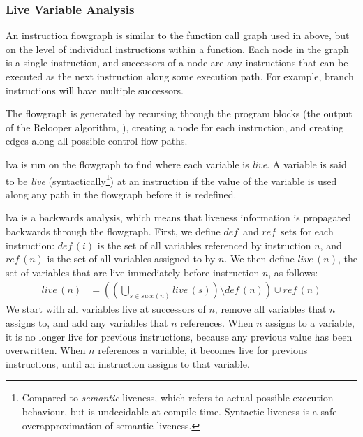 \documentclass[00-main.tex]{subfiles}
\begin{document}
\subsubsection{Live Variable Analysis}

\newcommand{\lvadef}{\ensuremath{\mathit{def}}}
\newcommand{\lvaref}{\ensuremath{\mathit{ref}}}

An instruction flowgraph is similar to the function call graph used in  above, but on the level of individual instructions within a function.
Each node in the graph is a single instruction, and successors of a node are any instructions that can be executed as the next instruction along some execution path.
For example, branch instructions will have multiple successors.

The flowgraph is generated by recursing through the program blocks (the output of the Relooper algorithm, ), creating a node for each instruction, and creating edges along all possible control flow paths.

\Gls{lva} is run on the flowgraph to find where each variable is \emph{live}.
A variable is said to be \emph{live} (syntactically\footnote{Compared to \emph{semantic} liveness, which refers to actual possible execution behaviour, but is undecidable at compile time. Syntactic liveness is a safe overapproximation of semantic liveness.}) at an instruction if the value of the variable is used along any path in the flowgraph before it is redefined.

\Gls{lva} is a backwards analysis, which means that liveness information is propagated backwards through the flowgraph.
First, we define \lvadef\ and \lvaref\ sets for each instruction: $\lvadef\,(i)$ is the set of all variables referenced by instruction $n$, and $\lvaref\,(n)$ is the set of all variables assigned to by $n$.
We then define $\mathit{live}\,(n)$, the set of variables that are live immediately before instruction $n$, as follows:
\begin{align*}
  \mathit{live}\,(n) &= \left( \left( \bigcup_{s \in \mathit{succ}(n)} \mathit{live}\,(s) \right) \setminus \lvadef\,(n) \right) \cup \lvaref\,(n)
\end{align*}
We start with all variables live at successors of $n$, remove all variables that $n$ assigns to, and add any variables that $n$ references.
When $n$ assigns to a variable, it is no longer live for previous instructions, because any previous value has been overwritten.
When $n$ references a variable, it becomes live for previous instructions, until an instruction assigns to that variable.
\end{document}
